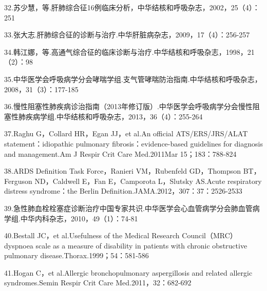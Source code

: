 32.苏少慧，等.肝肺综合征16例临床分析，中华结核和呼吸杂志，2002，25（4）：251

33.张大志.肝肺综合征的诊断与治疗.中华肝脏病杂志，2009，17（4）：256-257

34.韩江娜，等.高通气综合征的临床诊断与治疗.中华结核和呼吸杂志，1998，21（2）：98

35.中华医学会呼吸病学分会哮喘学组.支气管哮喘防治指南.中华结核和呼吸杂志，2008，31（3）：177-185

36.慢性阻塞性肺疾病诊治指南（2013年修订版）.中华医学会呼吸病学分会慢性阻塞性肺疾病学组.中华结核和呼吸杂志，2013，36（4）：255-264

37.Raghu G，Collard HR，Egan JJ，et al.An official ATS/ERS/JRS/ALAT
statement：idiopathic pulmonary fibrosis：evidence-based guidelines for
diagnosis and management.Am J Respir Crit Care Med.2011Mar
15；183：788-824

38.ARDS Definition Task Force，Ranieri VM，Rubenfeld GD，Thompson
BT，Ferguson ND，Caldwell E，Fan E，Camporota L，Slutsky AS.Acute
respiratory distress syndrome：the Berlin
Definition.JAMA.2012，307：37：2526-2533

39.急性肺血栓栓塞症诊断治疗中国专家共识.中华医学会心血管病学分会肺血管病学组.中华内科杂志，2010，49（1）：74-81

40.Bestall JC，et al.Usefulness of the Medical Research
Council（MRC）dyspnoea scale as a measure of disability in patients with
chronic obstructive pulmonary disease.Thorax.1999；54：581-586

41.Hogan C，et al.Allergic bronchopulmonary aspergillosis and related
allergic syndromes.Semin Respir Crit Care Med.2011，32：682-692

\protect\hypertarget{text00056.html}{}{}

